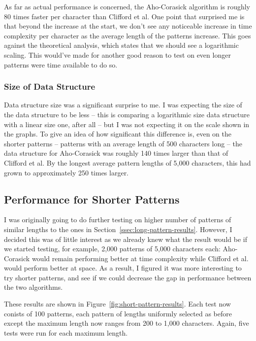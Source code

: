 \documentclass[ %
                    author={Dominic Joseph Moylett},
                    degree={MEng},
                     title={Dictionary Matching with Fingerprints},
                  subtitle={An Empirical Analysis},
                      type={research},
                      year={2015} ]{dissertation}
\begin{document}
As far as actual performance is concerned, the Aho-Corasick algorithm is roughly 80 times faster per character than Clifford et al. One point that surprised me is that beyond the increase at the start, we don't see any noticeable increase in time complexity per character as the average length of the patterns increase. This goes against the theoretical analysis, which states that we should see a logarithmic scaling. This would've made for another good reason to test on even longer patterns were time available to do so.

\subsubsection{Size of Data Structure}

Data structure size was a significant surprise to me. I was expecting the size of the data structure to be less -- this is comparing a logarithmic size data structure with a linear size one, after all -- but I was not expecting it on the scale shown in the graphs. To give an idea of how significant this difference is, even on the shorter patterns -- patterns with an average length of 500 characters long -- the data structure for Aho-Corasick was roughly 140 times larger than that of Clifford et al. By the longest average pattern lengths of 5,000 characters, this had grown to approximately 250 times larger.

\subsection{Performance for Shorter Patterns}
\label{ssec:short-pattern-results}

I was originally going to do further testing on higher number of patterns of similar lengths to the ones in Section~\ref{ssec:long-pattern-results}. However, I decided this was of little interest as we already knew what the result would be if we started testing, for example, 2,000 patterns of 5,000 characters each: Aho-Corasick would remain performing better at time complexity while Clifford et al. would perform better at space. As a result, I figured it was more interesting to try shorter patterns, and see if we could decrease the gap in performance between the two algorithms.

These results are shown in Figure~\ref{fig:short-pattern-results}. Each test now conists of 100 patterns, each pattern of lengths uniformly selected as before except the maximum length now ranges from 200 to 1,000 characters. Again, five tests were run for each maximum length.
\end{document}
